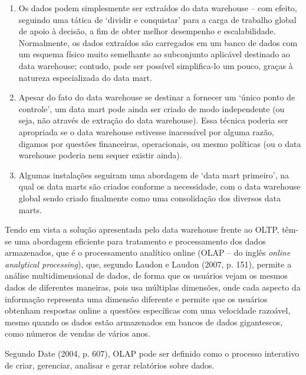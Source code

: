 \documentclass[a4paper]{article}
\newcommand\liststyleWWviiiNumxxviii{%
\renewcommand\theenumi{\alph{enumi}}
\renewcommand\theenumii{\alph{enumii}}
\renewcommand\theenumiii{\roman{enumiii}}
\renewcommand\theenumiv{\arabic{enumiv}}
\renewcommand\labelenumi{\theenumi)}
\renewcommand\labelenumii{\theenumii.}
\renewcommand\labelenumiii{\theenumiii.}
\renewcommand\labelenumiv{\theenumiv.}
}
\begin{document}
\liststyleWWviiiNumxxviii
\begin{enumerate}
\item {
\textsf{Os dados podem simplesmente ser extra\'idos do data warehouse -- com efeito, seguindo uma t\'atica de `dividir e
conquistar' para a carga de trabalho global de apoio \`a decis\~ao, a fim de obter melhor desempenho e escalabilidade.
Normalmente, os dados extra\'idos s\~ao carregados em um banco de dados com um esquema f\'isico muito semelhante ao
subconjunto aplic\'avel destinado ao data warehouse; contudo, pode ser poss\'ivel simplifica-lo um pouco, gra\c{c}as
\`a natureza especializada do data mart.}}
\item {
\textsf{Apesar do fato do data warehouse se destinar a fornecer um `\'unico ponto de controle', um data mart pode ainda
ser criado de modo independente (ou seja, n\~ao atrav\'es de extra\c{c}\~ao do data warehouse). Essa t\'ecnica poderia
ser apropriada se o data warehouse estivesse inacess\'ivel por alguma raz\~ao, digamos por quest\~oes financeiras,
operacionais, ou mesmo pol\'iticas (ou o data warehouse poderia nem sequer existir ainda).}}
\item {\sffamily
Algumas instala\c{c}\~oes seguiram uma abordagem de `data mart primeiro', na qual os data marts s\~ao criados conforme a
necessidade, com o data warehouse global sendo criado finalmente como uma consolida\c{c}\~ao dos diversos data marts.}
\end{enumerate}
{
\textsf{Tendo em vista a solu\c{c}\~ao apresentada pelo data warehouse frente ao OLTP, t\^em-se uma abordagem eficiente
para tratamento e processamento dos dados armazenados, que \'e o processamento anal\'itico online (OLAP -- do ingl\^es
}\textsf{\textit{online analytical processing}}\textsf{), que, segundo Laudon e Laudon (2007, p. 151), permite a
an\'alise multidimensional de dados, de forma que os usu\'arios vejam os mesmos dados de diferentes maneiras, pois usa
m\'ultiplas dimens\~oes, onde cada aspecto da informa\c{c}\~ao representa uma dimens\~ao diferente e permite que os
usu\'arios obtenham respostas online a quest\~oes espec\'ificas com uma velocidade razo\'avel, mesmo quando os dados
est\~ao armazenados em bancos de dados gigantescos, como n\'umeros de vendas de v\'arios anos.}}

{\sffamily
Segundo Date (2004, p. 607), OLAP pode ser definido como o processo interativo de criar, gerenciar, analisar e gerar
relat\'orios sobre dados.}
\end{document}
